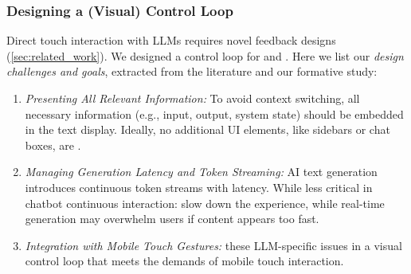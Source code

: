 \subsubsection{Designing a (Visual) Control Loop}
\label{sec:vis_design}
Direct touch interaction with LLMs requires novel feedback designs (\cref{sec:related_work}). 
We designed a control loop for \spread{} and \pinch{}. %
Here we list our \textit{design challenges and goals}, extracted from the literature and our formative study:
\begin{enumerate} 
\item \textit{Presenting All Relevant Information:}
To avoid context switching, all necessary information (e.g., input, output, system state) should be embedded in the text display. Ideally, no additional UI elements, like sidebars or chat boxes, are .
\item \textit{Managing Generation Latency and Token Streaming:} AI text generation introduces continuous token streams with latency. While less critical in chatbot  continuous interaction:  slow down the experience, while real-time generation may overwhelm users if content appears too fast. %
\item \textit{Integration with Mobile Touch Gestures:} %
 these LLM-specific issues in a visual control loop that meets the demands of mobile touch interaction.
\end{enumerate}

